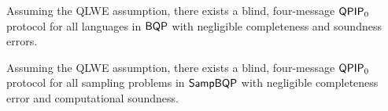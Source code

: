 
\begin{cor}
	Assuming the QLWE assumption, there exists a blind, four-message $\operatorname{\mathsf{QPIP}}_0$ protocol for all languages in $\operatorname{\mathsf{BQP}}$ with negligible completeness and soundness errors.
\end{cor}

\begin{cor}
		Assuming the QLWE assumption, there exists a blind, four-message $\operatorname{\mathsf{QPIP}}_0$ protocol for all sampling problems in $\operatorname{\mathsf{SampBQP}}$ with negligible completeness error and computational soundness.
\end{cor}
